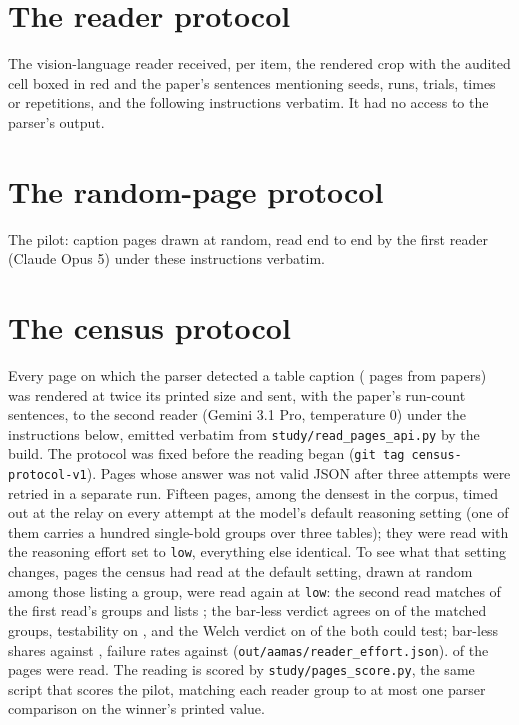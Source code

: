 \documentclass[sigconf,anonymous]{aamas}
\begin{document}
\section{The reader protocol}
\label{app:protocol}
The vision-language reader received, per item, the rendered crop with the
audited cell boxed in red and the paper's sentences mentioning seeds, runs,
trials, times or repetitions, and the following instructions verbatim. It had
no access to the parser's output.

{\scriptsize}

\section{The random-page protocol}
\label{app:pages}
The pilot: \nPagesRead{} caption pages drawn at random, read end to end by
the first reader (Claude Opus 5) under these instructions verbatim.
{\scriptsize}

\section{The census protocol}
\label{app:census}
Every page on which the parser detected a table caption (\nCzPagesDrawn{}
pages from \nCzPapersDrawn{} papers) was rendered at twice its printed size
and sent, with the paper's run-count sentences, to the second reader (Gemini
3.1 Pro, temperature 0) under the instructions below, emitted verbatim from
\texttt{study/read\_pages\_api.py} by the build. The protocol was fixed
before the reading began (\texttt{git tag census-protocol-v1}). Pages whose
answer was not valid JSON after three attempts were retried in a separate
run. Fifteen pages, among the densest in the corpus, timed out at the relay
on every attempt at the model's default reasoning setting (one of them
carries a hundred single-bold groups over three tables); they were read
with the reasoning effort set to \texttt{low}, everything else identical.
To see what that setting changes, \nRePages{} pages the census had read at
the default setting, drawn at random among those listing a group, were read
again at \texttt{low}: the second read matches \nReMatchedCi{} of the first
read's \nReGroupsFirst{} groups and lists \nReGroupsSecond{}; the bar-less
verdict agrees on \nReNeitherAgreePct{} of the matched groups, testability on
\nReTestableAgreePct{}, and the Welch verdict on \nReFailAgree{} of the
\nReBothTested{} both could test; bar-less shares \nReNeitherFirst{} against
\nReNeitherSecond{}, failure rates \nReFailFirst{} against \nReFailSecond{}
(\texttt{out/aamas/reader\_effort.json}). \nCzPagesRead{} of the
\nCzPagesDrawn{} pages were read. The reading is
scored by \texttt{study/pages\_score.py}, the same script that scores the
pilot, matching each reader group to at most one parser comparison on the
winner's printed value.
\end{document}
